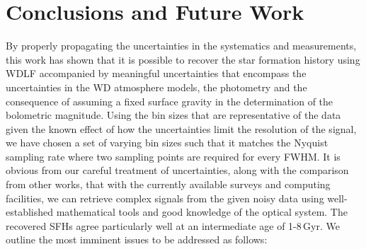 \documentclass[fleqn,usenatbib]{mnras}
\begin{document}
\section{Conclusions and Future Work}
\label{sec:conclusion}
By properly propagating the uncertainties in the systematics and measurements,
this work has shown that it is possible to recover the star formation history 
using WDLF accompanied by meaningful uncertainties that encompass the 
uncertainties in the WD atmosphere models, the photometry and the consequence
of assuming a fixed surface gravity in the determination of the bolometric 
magnitude. Using the bin sizes that are representative of the data given the
known effect of how the uncertainties limit the resolution of the signal, we
have chosen a set of varying bin sizes such that it matches the Nyquist
sampling rate where two sampling points are required for every FWHM. It is 
obvious from our careful treatment of uncertainties, along with the comparison 
from other works, that with the currently available surveys and computing
facilities, we can retrieve complex signals from the given noisy data using
well-established mathematical tools and good knowledge of the optical system.
The recovered SFHs agree particularly well at an intermediate age of 1-8\,Gyr.
We outline the most imminent issues to be addressed as follows:

\end{document}
